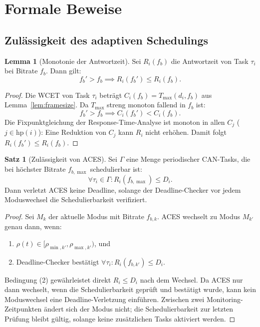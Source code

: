 ﻿\documentclass[a4paper,12pt]{article}
\theoremstyle{definition}
\newtheorem{satz}{Satz}
\newtheorem{lemma}{Lemma}
\begin{document}
\section{Formale Beweise}

\subsection{Zul\"{a}ssigkeit des adaptiven Schedulings}

\begin{lemma}[Monotonie der Antwortzeit]
\label{lem:monoton}
Sei $R_i(f_b)$ die Antwortzeit von Task $\tau_i$ bei Bitrate $f_b$.
Dann gilt:
\[
    f_b' > f_b \implies R_i(f_b') \leq R_i(f_b).
\]
\end{lemma}

\begin{proof}
Die WCET von Task $\tau_i$ betr\"{a}gt $C_i(f_b) = T_{\max}(d_i, f_b)$ aus Lemma~\ref{lem:framesize}.
Da $T_{\max}$ streng monoton fallend in $f_b$ ist:
\[
    f_b' > f_b \implies C_i(f_b') < C_i(f_b).
\]
Die Fixpunktgleichung der Response-Time-Analyse ist monoton in allen $C_j$ ($j \in \mathrm{hp}(i)$):
Eine Reduktion von $C_j$ kann $R_i$ nicht erh\"{o}hen.
Damit folgt $R_i(f_b') \leq R_i(f_b)$.
\end{proof}

\begin{satz}[Zul\"{a}ssigkeit von ACES]
\label{satz:zulaessigkeit}
Sei $\Gamma$ eine Menge periodischer CAN-Tasks, die bei h\"{o}chster Bitrate $f_{b,\max}$
schedulierbar ist:
\[
    \forall \tau_i \in \Gamma: R_i(f_{b,\max}) \leq D_i.
\]
Dann verletzt ACES keine Deadline, solange der Deadline-Checker vor jedem Moduswechsel
die Schedulierbarkeit verifiziert.
\end{satz}

\begin{proof}
Sei $M_k$ der aktuelle Modus mit Bitrate $f_{b,k}$.
ACES wechselt zu Modus $M_{k'}$ genau dann, wenn:
\begin{enumerate}
    \item $\rho(t) \in [\rho_{\min,k'}, \rho_{\max,k'})$, und
    \item Deadline-Checker best\"{a}tigt $\forall \tau_i: R_i(f_{b,k'}) \leq D_i$.
\end{enumerate}
Bedingung (2) gew\"{a}hrleistet direkt $R_i \leq D_i$ nach dem Wechsel.
Da ACES nur dann wechselt, wenn die Schedulierbarkeit gepr\"{u}ft und best\"{a}tigt wurde,
kann kein Moduswechsel eine Deadline-Verletzung einf\"{u}hren.
Zwischen zwei Monitoring-Zeitpunkten \"{a}ndert sich der Modus nicht;
die Schedulierbarkeit zur letzten Pr\"{u}fung bleibt g\"{u}ltig, solange keine
zus\"{a}tzlichen Tasks aktiviert werden.
\end{proof}
\end{document}

